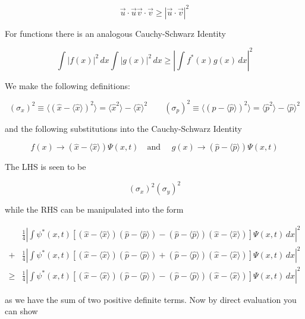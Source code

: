 \[
\vec{u}\cdot \vec{u} \vec{v} \cdot \vec{v} \geq |\vec{u}\cdot \vec{v}|^2
\] \vspace{3px}

For functions there is an analogous Cauchy-Schwarz Identity

\[
  \int |f(x)|^2 \, dx \int |g(x)|^2 \, dx \geq \left| \int f^*(x) g(x) \, dx
  \right|^2
\] \vspace{3px}

We make the following definitions: 

\[
  (\sigma_x)^2 \equiv \langle (\hat{x} - \langle \hat{x} \rangle )^2 \rangle
  = \langle \hat{x}^2 \rangle - \langle \hat{x} \rangle ^2
  \qquad (\sigma_p)^2 \equiv \langle (\hat{p} - \langle \hat{p} \rangle )^2
  \rangle = \langle \hat{p}^2 \rangle - \langle \hat{p} \rangle ^2
\] \vspace{3px}

and the following substitutions into the Cauchy-Schwarz Identity 

\[
f(x) \rightarrow (\hat{x} - \langle \hat{x} \rangle ) \Psi(x, t) \quad \text{
and } \quad g(x) \rightarrow (\hat{p} - \langle \hat{p} \rangle )\Psi(x, t)
\] \vspace{3px}

The LHS is seen to be 

\[
  (\sigma_x)^2(\sigma_y)^2
\] \vspace{3px}

while the RHS can be manipulated into the form 

\begin{align*}
  &\frac{1}{4}\left| \int \psi^*(x, t) [(\hat{x} - \langle \hat{x} \rangle
    )(\hat{p} - \langle \hat{p} \rangle ) - (\hat{p} - \langle \hat{p} \rangle
    )(\hat{x} - \langle \hat{x} \rangle )] \Psi(x, t) \, dx \right|^2 \\ 
  +&\frac{1}{4}\left| \int \psi^*(x, t) [(\hat{x} - \langle \hat{x} \rangle
    )(\hat{p} - \langle \hat{p} \rangle ) + (\hat{p} - \langle \hat{p} \rangle
    )(\hat{x} - \langle \hat{x} \rangle )] \Psi(x, t) \, dx \right|^2 \\
  \geq &\frac{1}{4}\left| \int \psi^*(x, t) [(\hat{x} - \langle \hat{x} \rangle
    )(\hat{p} - \langle \hat{p} \rangle ) - (\hat{p} - \langle \hat{p} \rangle
    )(\hat{x} - \langle \hat{x} \rangle )] \Psi(x, t) \, dx \right|^2
\end{align*}\vspace{3px}

as we have the sum of two positive definite terms. Now by direct evaluation you
can show 


